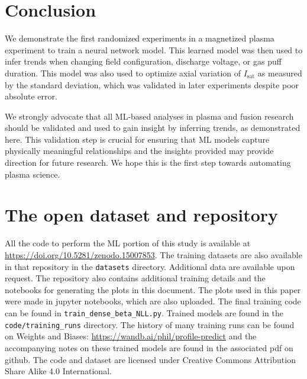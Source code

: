 \section{Conclusion}
\label{sec:isat-predict_conclusion}

We demonstrate the first randomized experiments in a magnetized plasma experiment to train a neural network model. This learned model was then used to infer trends when changing field configuration, discharge voltage, or gas puff duration. This model was also used to optimize axial variation of $I_\text{sat}$ as measured by the standard deviation, which was validated in later experiments despite poor absolute error. 

We strongly advocate that all ML-based analyses in plasma and fusion research should be validated  and used to gain insight by inferring trends, as demonstrated here. This validation step is crucial for ensuring that ML models capture physically meaningful relationships and the insights provided may provide direction for future research. We hope this is the first step towards automating plasma science.





\section{The open dataset and repository} 
\label{app:repo}
All the code to perform the ML portion of this study is available at \url{https://doi.org/10.5281/zenodo.15007853}. The training datasets are also available in that repository in the \texttt{datasets} directory. Additional data are available upon request. The repository also contains additional training details and the notebooks for generating the plots in this document. 
The plots used in this paper were made in jupyter notebooks, which are also uploaded. The final training code can be found in \texttt{train\_dense\_beta\_NLL.py}. Trained models are found in the \texttt{code/training\_runs} directory.
The history of many training runs can be found on Weights and Biases: \url{https://wandb.ai/phil/profile-predict} and the accompanying notes on these trained models are found in the associated pdf on github.
The code and dataset are licensed under Creative Commons Attribution Share Alike 4.0 International. 
